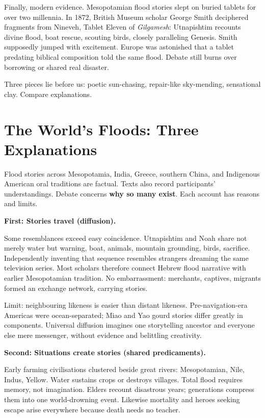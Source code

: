 Finally, modern evidence. Mesopotamian flood stories slept on buried tablets for over two millennia. In 1872, British Museum scholar George Smith deciphered fragments from Nineveh, Tablet Eleven of \textit{Gilgamesh}: Utnapishtim recounts divine flood, boat rescue, scouting birds, closely paralleling Genesis. Smith supposedly jumped with excitement. Europe was astonished that a tablet predating biblical composition told the same flood. Debate still burns over borrowing or shared real disaster.

Three pieces lie before us: poetic sun-chasing, repair-like sky-mending, sensational clay. Compare explanations.

\section{The World's Floods: Three Explanations}
Flood stories across Mesopotamia, India, Greece, southern China, and Indigenous American oral traditions are factual. Texts also record participants' understandings. Debate concerns \textbf{why so many exist}. Each account has reasons and limits.

\textbf{First: Stories travel (diffusion).}

Some resemblances exceed easy coincidence. Utnapishtim and Noah share not merely water but warning, boat, animals, mountain grounding, birds, sacrifice. Independently inventing that sequence resembles strangers dreaming the same television series. Most scholars therefore connect Hebrew flood narrative with earlier Mesopotamian tradition. No embarrassment: merchants, captives, migrants formed an exchange network, carrying stories.

Limit: neighbouring likeness is easier than distant likeness. Pre-navigation-era Americas were ocean-separated; Miao and Yao gourd stories differ greatly in components. Universal diffusion imagines one storytelling ancestor and everyone else mere messenger, without evidence and belittling creativity.

\textbf{Second: Situations create stories (shared predicaments).}

Early farming civilisations clustered beside great rivers: Mesopotamian, Nile, Indus, Yellow. Water sustains crops or destroys villages. Total flood requires memory, not imagination. Elders recount disastrous years; generations compress them into one world-drowning event. Likewise mortality and heroes seeking escape arise everywhere because death needs no teacher.

